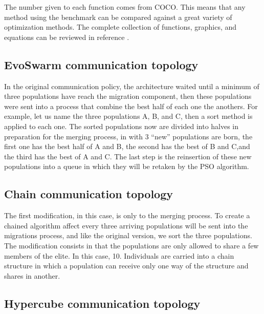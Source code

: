 \documentclass[runningheads]{llncs}
\begin{document}
The number given to each function comes from COCO. This means that any method using the benchmark can be compared against a great variety of optimization methods. The complete collection of functions, graphics, and equations can be reviewed in reference \cite{bbob}.

\subsection{EvoSwarm communication topology} %

In the original communication policy, the architecture waited until a minimum of
three populations have reach the migration component, then these populations
were sent into a process that combine the best half of each one the anothers.
For example, let us name the three populations A, B, and C, then a sort method
is applied to each one. The sorted populations now are divided into halves in
preparation for the merging process, in with 3 “new” populations are born, the
first one has the best half of A and B, the second has the best of B and C,and
the third has the best of A and C. The last step is the reinsertion of these new
populations into a queue in which they will be retaken by the PSO algorithm.

\subsection{Chain communication topology}

The first modification, in this case, is only to the merging process. To create
a chained algorithm affect every three arriving populations will be sent into
the migrations process, and like the original version, we sort the three
populations. The modification consists in that the populations are only allowed
to share a few members of the elite. In this case, 10. Individuals are carried
into a chain structure in which a population can receive only one way of the
structure and shares in another.


\subsection{Hypercube communication topology}
\end{document}
